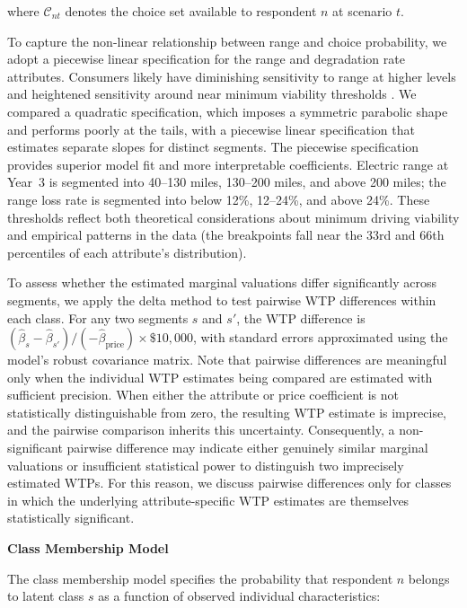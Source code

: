 \documentclass[a4paper,fleqn]{cas-sc}   %
\begin{document}
\noindent where $\mathcal{C}_{nt}$ denotes the choice set available to respondent $n$ at scenario $t$.

To capture the non-linear relationship between range and choice probability, we adopt a piecewise linear specification for the range and degradation rate attributes. Consumers likely have diminishing sensitivity to range at higher levels and heightened sensitivity around near minimum viability thresholds \parencite{dimitropoulosConsumerValuationChanges2013, hackbarthWillingnesstopayAlternativeFuel2016}. We compared a quadratic specification, which imposes a symmetric parabolic shape and performs poorly at the tails, with a piecewise linear specification that estimates separate slopes for distinct segments. The piecewise specification provides superior model fit and more interpretable coefficients. Electric range at Year~3 is segmented into 40--130 miles, 130--200 miles, and above 200 miles; the range loss rate is segmented into below 12\%, 12--24\%, and above 24\%. These thresholds reflect both theoretical considerations about minimum driving viability and empirical patterns in the data (the breakpoints fall near the 33rd and 66th percentiles of each attribute's distribution).

To assess whether the estimated marginal valuations differ significantly across segments, we apply the delta method to test pairwise WTP differences within each class. For any two segments $s$ and $s'$, the WTP difference is $(\hat{\beta}_s - \hat{\beta}_{s'}) / (-\hat{\beta}_{\text{price}}) \times \$10{,}000$, with standard errors approximated using the model's robust covariance matrix. Note that pairwise differences are meaningful only when the individual WTP estimates being compared are estimated with sufficient precision. When either the attribute or price coefficient is not statistically distinguishable from zero, the resulting WTP estimate is imprecise, and the pairwise comparison inherits this uncertainty. Consequently, a non-significant pairwise difference may indicate either genuinely similar marginal valuations or insufficient statistical power to distinguish two imprecisely estimated WTPs. For this reason, we discuss pairwise differences only for classes in which the underlying attribute-specific WTP estimates are themselves statistically significant.

\vspace{\baselineskip}
\noindent \textbf{Class Membership Model} \par

The class membership model specifies the probability that respondent $n$ belongs to latent class $s$ as a function of observed individual characteristics:
\end{document}
